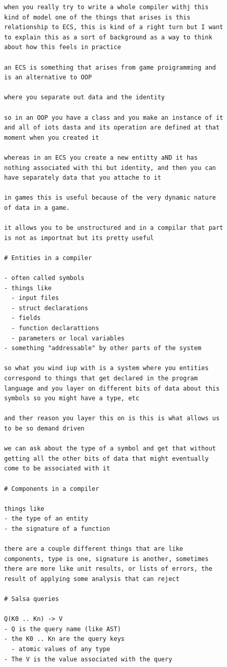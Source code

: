 \documentclass[12pt, a4paper]{report}
\begin{document}
\begin{Verbatim}
when you really try to write a whole compiler withj this
kind of model one of the things that arises is this
relationship to ECS, this is kind of a right turn but I want
to explain this as a sort of background as a way to think
about how this feels in practice

an ECS is something that arises from game proigramming and
is an alternative to OOP

where you separate out data and the identity

so in an OOP you have a class and you make an instance of it
and all of iots dasta and its operation are defined at that
moment when you created it

whereas in an ECS you create a new entitty aND it has
nothing associated with thi but identity, and then you can
have separately data that you attache to it

in games this is useful because of the very dynamic nature
of data in a game.

it allows you to be unstructured and in a compilar that part
is not as importnat but its pretty useful

# Entities in a compiler

- often called symbols
- things like
  - input files
  - struct declarations
  - fields
  - function declarattions
  - parameters or local variables
- something "addressable" by other parts of the system

so what you wind iup with is a system where you entities
correspond to things that get declared in the program
language and you layer on different bits of data about this
symbols so you might have a type, etc

and ther reason you layer this on is this is what allows us
to be so demand driven

we can ask about the type of a symbol and get that without
getting all the other bits of data that might eventually
come to be associated with it

# Components in a compiler

things like
- the type of an entity
- the signature of a function

there are a couple different things that are like
components, type is one, signature is another, sometimes
there are more like unit results, or lists of errors, the
result of applying some analysis that can reject

# Salsa queries

Q(K0 .. Kn) -> V
- Q is the query name (like AST)
- the K0 .. Kn are the query keys
  - atomic values of any type
- The V is the value associated with the query


\end{Verbatim}
\end{document}
